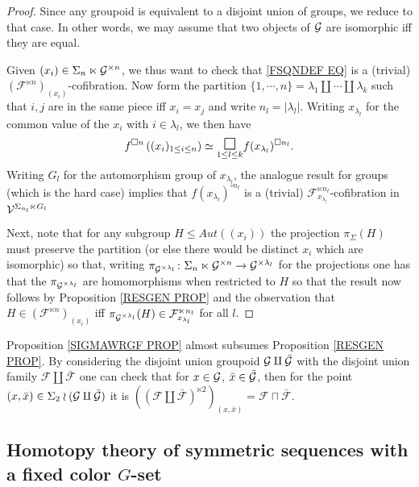 \documentclass[a4paper,10pt
,draft
]{article}%
\renewcommand{\F}{\mathcal F}
\renewcommand{\1}{\eta}%
\begin{document}
\begin{proof}
Since any groupoid is equivalent to a disjoint union of groups, we reduce to that case. In other words, we may assume that two objects of $\mathcal{G}$ are isomorphic iff they are equal.

Given $(x_i) \in \Sigma_n \ltimes \mathcal{G}^{\times n}$,
we thus want to check that \eqref{FSQNDEF EQ}
is a (trivial) $\left(\F^{\ltimes n}\right)_{(x_i)}$-cofibration.
Now form the partition 
$\{1,\cdots,n\} = \lambda_1 \amalg \cdots \amalg \lambda_k$
such that $i,j$ are in the same piece iff $x_i=x_j$ and write
$n_l = |\lambda_l|$.
Writing $x_{\lambda_l}$ for the common value of the $x_i$ with $i\in \lambda_l$, we then have
\[
f^{\square n}\left((x_i)_{1\leq i \leq n }\right)
\simeq
\underset{1\leq l \leq k}{\mathlarger{\mathlarger{\square}}} f(x_{\lambda_l})^{\square n_l}.
\]
Writing $G_l$ for the automorphism group of $x_{\lambda_l}$,
the analogue result for groups \cite[Prop. 6.24]{BP_geo}
(which is the hard case) implies that
$f(x_{\lambda_l})^{\square n_l}$
is a (trivial) $\F_{x_{\lambda_l}}^{\ltimes n_l}$-cofibration
in $\mathcal V^{\Sigma_{n_l}\ltimes G_l}$


Next, note that for any subgroup
$H \leq Aut((x_i))$ the projection 
$\pi_{\Sigma}(H)$ must preserve the partition 
(or else there would be distinct $x_i$ which are isomorphic) 
so that, writing 
$\pi_{\mathcal{G}^{\times \lambda_l}} \colon
\Sigma_n \ltimes \mathcal{G}^{\times n} \to \mathcal{G}^{\times \lambda_l}$
for the projections one has that the 
$\pi_{\mathcal{G}^{\times \lambda_l}}$ are homomorphisms when restricted to $H$ so that the result now follows by Proposition \ref{RESGEN PROP}
and the observation that
$H \in \left(\F^{\ltimes n}\right)_{(x_i)}$
iff
$\pi_{\G^{\times \lambda_l}}(H) \in \F_{x_{\lambda_l}}^{\ltimes n_l}$
for all $l$.
\end{proof}


\begin{remark}
Proposition \ref{SIGMAWRGF PROP} almost subsumes Proposition \ref{RESGEN PROP}. By considering the disjoint union groupoid 
$\mathcal{G} \amalg \bar{\mathcal{G}}$
with the disjoint union family 
$\F \amalg \bar{\F}$
one can check that for
$x \in \mathcal{G}$, $\bar{x} \in \bar{\mathcal{G}}$,
then for the point $(x,\bar{x}) \in \Sigma_2 \wr (\mathcal{G} \amalg \bar{\mathcal{G}})$
it is
$\left(\left(\F \amalg \bar{\F}\right)^{\ltimes 2}\right)_{(x,\bar{x})} = \F \sqcap \bar{\F}$.
\end{remark}


\subsection{Homotopy theory of symmetric sequences with a fixed color $G$-set}
\end{document}
